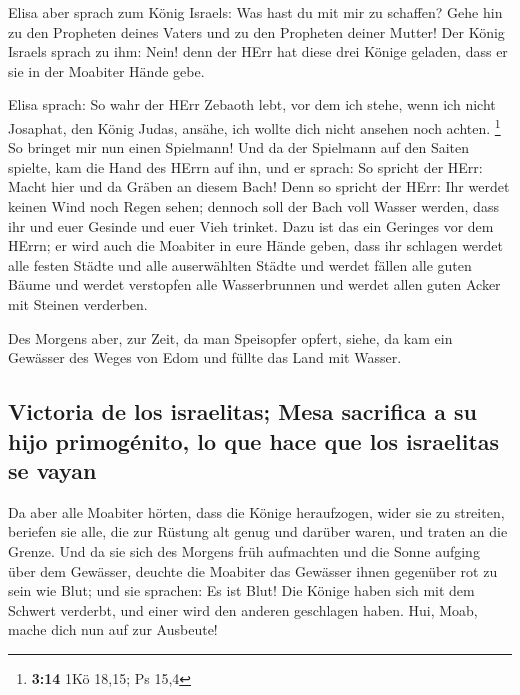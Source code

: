  Elisa aber sprach zum König Israels: Was hast du mit mir
zu schaffen? Gehe hin zu den Propheten deines Vaters und zu den
Propheten deiner Mutter! Der König Israels sprach zu ihm: Nein! denn der
HErr hat diese drei Könige geladen, dass er sie in der Moabiter Hände
gebe.

 Elisa sprach: So wahr der HErr Zebaoth lebt, vor dem ich
stehe, wenn ich nicht Josaphat, den König Judas, ansähe, ich wollte dich
nicht ansehen noch achten. \footnote{\textbf{3:14} 1Kö 18,15; Ps 15,4}
 So bringet mir nun einen Spielmann! Und da der Spielmann
auf den Saiten spielte, kam die Hand des HErrn auf ihn, 
und er sprach: So spricht der HErr: Macht hier und da Gräben an diesem
Bach!  Denn so spricht der HErr: Ihr werdet keinen Wind
noch Regen sehen; dennoch soll der Bach voll Wasser werden, dass ihr und
euer Gesinde und euer Vieh trinket.  Dazu ist das ein
Geringes vor dem HErrn; er wird auch die Moabiter in eure Hände geben,
 dass ihr schlagen werdet alle festen Städte und alle
auserwählten Städte und werdet fällen alle guten Bäume und werdet
verstopfen alle Wasserbrunnen und werdet allen guten Acker mit Steinen
verderben.

 Des Morgens aber, zur Zeit, da man Speisopfer opfert,
siehe, da kam ein Gewässer des Weges von Edom und füllte das Land mit
Wasser.

\hypertarget{victoria-de-los-israelitas-mesa-sacrifica-a-su-hijo-primoguxe9nito-lo-que-hace-que-los-israelitas-se-vayan}{%
\subsection{Victoria de los israelitas; Mesa sacrifica a su hijo
primogénito, lo que hace que los israelitas se
vayan}\label{victoria-de-los-israelitas-mesa-sacrifica-a-su-hijo-primoguxe9nito-lo-que-hace-que-los-israelitas-se-vayan}}

 Da aber alle Moabiter hörten, dass die Könige
heraufzogen, wider sie zu streiten, beriefen sie alle, die zur Rüstung
alt genug und darüber waren, und traten an die Grenze. 
Und da sie sich des Morgens früh aufmachten und die Sonne aufging über
dem Gewässer, deuchte die Moabiter das Gewässer ihnen gegenüber rot zu
sein wie Blut;  und sie sprachen: Es ist Blut! Die Könige
haben sich mit dem Schwert verderbt, und einer wird den anderen
geschlagen haben. Hui, Moab, mache dich nun auf zur Ausbeute!

